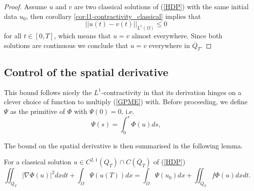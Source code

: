 \documentclass[11pt, a4paper]{article}
\begin{document}
\begin{proof}
Assume $u$ and $v$ are two classical solutions of (\ref{HDP}) with the same initial data $u_0$, then corollary \ref{cor:l1-contractivity_classical} implies that
\begin{equation*}
||u(t)-v(t)||_{L^1(\Omega)} \leq 0
\end{equation*}
for all $t \in [0,T]$, which means that $u=v$ almost everywhere. Since both solutions are continuous we conclude that $u=v$ everywhere in $\overline{Q}_T$.
\end{proof}

\subsection{Control of the spatial derivative}
This bound follows nicely the $L^1$-contractivity in that its derivation hinges on a clever choice of function to multiply (\ref{GPME}) with. Before proceeding, we define  $\Psi$ as the primitive of $\Phi$ with $\Psi(0) = 0$, i.e.
\begin{equation}
\label{phi_primitive}
	\Psi(s) = \int_0^s \Phi(u) ds,
\end{equation}

The bound on the spatial derivative is then summarised in the following lemma.

\begin{lemma}
\label{lem:Energy_equality_classical}
For a classical solution $u\in C^{2,1}(Q_T) \cap C(\overline{Q}_T)$ of (\ref{HDP})
\begin{equation}
\label{spatial_derivative_bound}
\iint_{Q_T} |\nabla \Phi(u)|^2dxdt + \int_\Omega \Psi(u(T))dx = \int_\Omega \Psi(u_0)dx + \iint_{Q_T} f\Phi(u)dxdt.
\end{equation}
\end{lemma}
\end{document}
